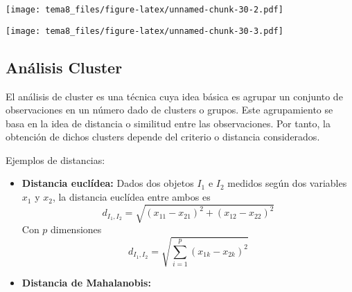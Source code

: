 \documentclass[]{article}
\def\tightlist{}
\newenvironment{Shaded}{\begin{snugshade}}{\end{snugshade}}
\newcommand{\KeywordTok}[1]{\textcolor[rgb]{0.13,0.29,0.53}{\textbf{{#1}}}}
\newcommand{\DataTypeTok}[1]{\textcolor[rgb]{0.13,0.29,0.53}{{#1}}}
\newcommand{\DecValTok}[1]{\textcolor[rgb]{0.00,0.00,0.81}{{#1}}}
\newcommand{\FloatTok}[1]{\textcolor[rgb]{0.00,0.00,0.81}{{#1}}}
\newcommand{\StringTok}[1]{\textcolor[rgb]{0.31,0.60,0.02}{{#1}}}
\newcommand{\CommentTok}[1]{\textcolor[rgb]{0.56,0.35,0.01}{\textit{{#1}}}}
\newcommand{\NormalTok}[1]{{#1}}
\numberwithin{equation}{section}
\begin{document}
\texttt{[image: tema8\_files/figure-latex/unnamed-chunk-30-2.pdf]}

\begin{Shaded}
\end{Shaded}

\texttt{[image: tema8\_files/figure-latex/unnamed-chunk-30-3.pdf]}

\subsection{Análisis Cluster}\label{analisis-cluster}

El análisis de cluster es una técnica cuya idea básica es agrupar un
conjunto de observaciones en un número dado de clusters o grupos. Este
agrupamiento se basa en la idea de distancia o similitud entre las
observaciones. Por tanto, la obtención de dichos clusters depende del
criterio o distancia considerados.

Ejemplos de distancias:

\begin{itemize}
\tightlist
\item
  \textbf{Distancia euclídea:} Dados dos objetos \(I_1\) e \(I_2\)
  medidos según dos variables \(x_1\) y \(x_2\), la distancia euclídea
  entre ambos es \[
      d_{I_1,I_2} = \sqrt{(x_{11} - x_{21})^2+(x_{12} - x_{22})^2}  
    \] Con \(p\) dimensiones \[
      d_{I_1,I_2} = \sqrt{\sum_{i=1}^{p}(x_{1k} - x_{2k})^2}  
    \]
\item
  \textbf{Distancia de Mahalanobis:}
\end{itemize}
\end{document}
